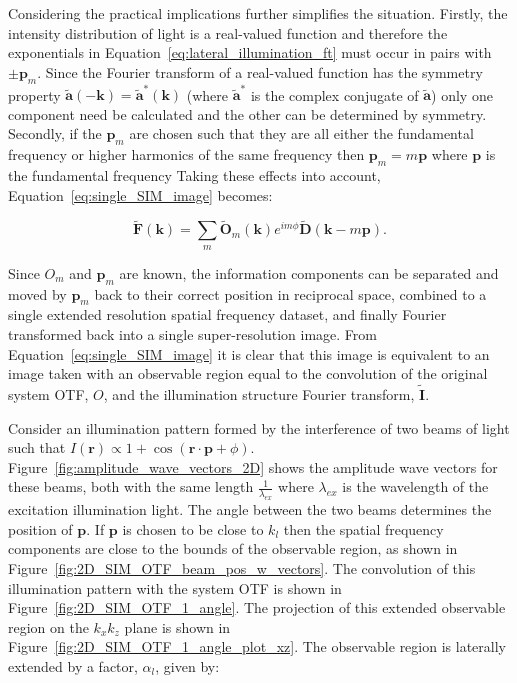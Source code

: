 Considering the practical implications further simplifies the situation. 
Firstly, the intensity distribution of light is a real-valued function and
therefore the exponentials in Equation~\ref{eq:lateral_illumination_ft} must
occur in pairs with $\pm\textbf{p}_{m}$. Since the Fourier transform of a 
real-valued function has the symmetry property $\tilde{\textbf{a}}(-\textbf{k}) = 
\tilde{\textbf{a}}^{*}(\textbf{k})$ (where $\tilde{\textbf{a}}^{*}$ is the complex conjugate of $\tilde{\textbf{a}}$) only one component need be calculated and the
other can be determined by symmetry. Secondly, if the $\textbf{p}_{m}$ are
chosen such that they are all either the fundamental frequency or higher 
harmonics of the same frequency then $\textbf{p}_{m} = m\textbf{p}$ where
$\textbf{p}$ is the fundamental frequency Taking these effects into 
account, Equation~\ref{eq:single_SIM_image} becomes:

\begin{equation}\label{eq:single_SIM_image_simple}
\tilde{\textbf{F}}(\textbf{k}) = \sum\limits_{m}{\tilde{\textbf{O}}_{m}(\textbf{k})e^{im\phi}\tilde{\textbf{D}}\left(\textbf{k} - m\textbf{p}\right)}.
\end{equation}

Since $O_{m}$ and $\textbf{p}_{m}$ are known, the information components
can be separated and moved by $\textbf{p}_{m}$ back to their correct 
position in reciprocal space, combined to a single extended resolution
spatial frequency dataset, and finally Fourier transformed back into a 
single super-resolution image.  From Equation~\ref{eq:single_SIM_image} 
it is clear that this image is equivalent to an image taken with an 
observable region equal to the convolution of the original system OTF, 
$O$, and the illumination structure Fourier transform, $\tilde{\textbf{I}}$. 

Consider an illumination pattern formed by the interference of two beams 
of light such that $I(\textbf{r}) \propto 1 + \cos(\textbf{r}\cdot
\textbf{p} + \phi)$. Figure~\ref{fig:amplitude_wave_vectors_2D} shows 
the amplitude wave vectors for these beams, both with the same length 
$\frac{1}{\lambda_{ex}}$ where $\lambda_{ex}$ is the wavelength of the 
excitation illumination light. The angle between the two beams determines 
the position of $\textbf{p}$. If $\textbf{p}$ is chosen to be close to 
$k_{l}$ then the spatial frequency components are close to the bounds 
of the observable region, as shown in 
Figure~\ref{fig:2D_SIM_OTF_beam_pos_w_vectors}. The convolution of this 
illumination pattern with the system OTF is shown in 
Figure~\ref{fig:2D_SIM_OTF_1_angle}. The projection of this extended 
observable region on the $k_{x}k_{z}$ plane is shown in 
Figure~\ref{fig:2D_SIM_OTF_1_angle_plot_xz}. The observable region
is laterally extended by a factor, $\alpha_{l}$, given by:

